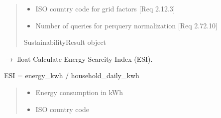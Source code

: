 \documentclass[letterpaper,10pt,english]{sphinxmanual}
\begin{document}
\begin{fulllineitems}
\begin{fulllineitems}
\begin{quote}
\begin{description}
\begin{itemize}
\item {} 
\sphinxAtStartPar
{} \textendash{} ISO country code for grid factors {[}Req 2.1\sphinxhyphen{}2.3{]}

\item {} 
\sphinxAtStartPar
{} \textendash{} Number of queries for per\sphinxhyphen{}query normalization {[}Req 2.7\sphinxhyphen{}2.10{]}

\end{itemize}

\sphinxAtStartPar
SustainabilityResult object

\end{description}\end{quote}

\end{fulllineitems}


\begin{fulllineitems}
\label{\detokenize{core.sustainability.calculator:core.sustainability.calculator.SustainabilityCalculator.calculate_scarcity_index}}
\pysigstartsignatures
\pysiglinewithargsret
{}
{\sphinxparamcomma {}}
{{ $\rightarrow$ float}}
\pysigstopsignatures
\sphinxAtStartPar
Calculate Energy Scarcity Index (ESI).

\sphinxAtStartPar
ESI = energy\_kwh / household\_daily\_kwh
\begin{quote}\begin{description}
\begin{itemize}
\item {} 
\sphinxAtStartPar
{} \textendash{} Energy consumption in kWh

\item {} 
\sphinxAtStartPar
{} \textendash{} ISO country code


\end{itemize}
\end{description}
\end{quote}
\end{fulllineitems}
\end{fulllineitems}
\end{document}
